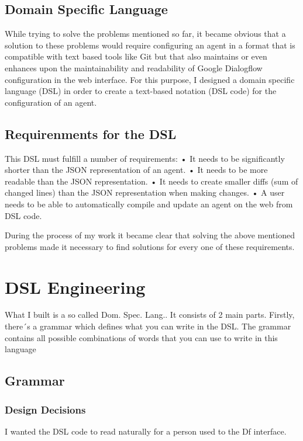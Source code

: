 \subsection{Domain Specific Language}
While trying to solve the problems mentioned so far, it became obvious that a solution to these problems would require configuring an agent in a format that is compatible with text based tools like Git but that also maintains or even enhances upon the maintainability and readability of Google Dialogflow configuration in the web interface.
For this purpose, I designed a domain specific language (DSL) in order to create a text-based notation (DSL code) for the configuration of an agent.

\subsection{Requirenments for the DSL}

This DSL must fulfill a number of requirements:
•	It needs to be significantly shorter than the JSON representation of an agent.
•	It needs to be more readable than the JSON representation.
•	It needs to create smaller diffs (sum of changed lines) than the JSON representation when making changes.
•	A user needs to be able to automatically compile and update an agent on the web from DSL code.

During the process of my work it became clear that solving the above mentioned problems made it necessary to find solutions for every one of these requirements.

\section{DSL Engineering}

What I built is a so called Dom. Spec. Lang..
It consists of 2 main parts.
Firstly, there´s a grammar which defines what you can write in the DSL.
The grammar contains all possible combinations of words that you can use to write in this language

\subsection{Grammar}

\subsubsection{Design Decisions}

I wanted the DSL code to read naturally for a person used to the Df interface.

